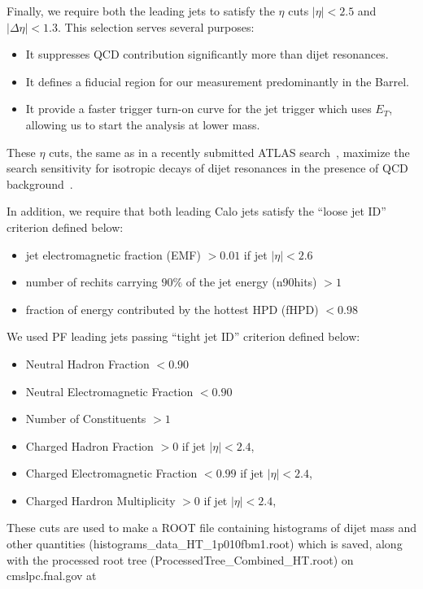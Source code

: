 Finally, we require both the leading jets to satisfy the $\eta$ cuts
$|\eta|<2.5$ and $|\Delta\eta|<1.3$. This selection serves several
purposes:
\begin{itemize}
\item It suppresses QCD contribution significantly more than dijet resonances.
\item It defines a fiducial region for our measurement predominantly in the
Barrel.
\item It provide a faster trigger turn-on curve for the jet trigger which uses
$E_T$, allowing us to start the analysis at lower mass.
\end{itemize}
These $\eta$ cuts, the same as in a recently submitted ATLAS
search~\cite{ATLAS_Search}, maximize the search sensitivity for
isotropic decays of dijet resonances in the presence of QCD
background~\cite{refExoticaMultijetsTalk}.

In addition, we require that both leading Calo jets satisfy the ``loose jet
ID'' criterion defined below:
\begin{itemize}
\item jet electromagnetic fraction (EMF) $> 0.01$ if jet $|\eta|<2.6$
\item number of rechits carrying $90\%$ of the jet energy (n90hits) $> 1$
\item fraction of energy contributed by the hottest HPD (fHPD) $< 0.98$
\end{itemize}

We used PF leading jets passing ``tight jet ID'' criterion defined below:

\begin{itemize}
\item Neutral Hadron Fraction $< 0.90$
\item Neutral Electromagnetic Fraction $< 0.90$
\item Number of Constituents $> 1$
\item Charged Hadron Fraction $> 0$ if jet  $|\eta|<2.4$,
\item Charged Electromagnetic Fraction $<0.99$ if jet  $|\eta|<2.4$,
\item Charged Hardron Multiplicity $> 0$ if jet  $|\eta|<2.4$,
\end{itemize}

These cuts are used to make a ROOT file containing histograms of dijet
mass and other quantities (histograms\_data\_HT\_1p010fbm1.root) which is saved,
along with the processed root tree (ProcessedTree\_Combined\_HT.root) on
cmslpc.fnal.gov at

